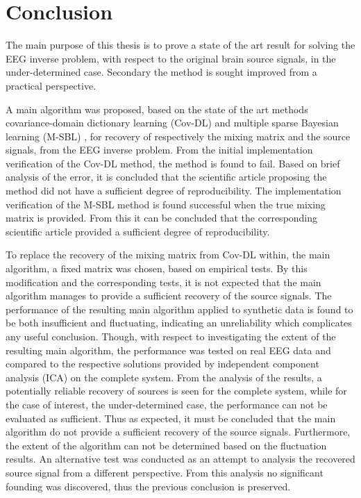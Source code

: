 \chapter{Conclusion}
The main purpose of this thesis is to prove a state of the art result for solving the EEG inverse problem, with respect to the original brain source signals, in the under-determined case.
Secondary the method is sought improved from a practical perspective.

A main algorithm was proposed, based on the state of the art methods covariance-domain dictionary learning (Cov-DL) \cite{Balkan2015} and multiple sparse Bayesian learning (M-SBL) \cite{Balkan2014}, for recovery of respectively the mixing matrix and the source signals, from the EEG inverse problem. 
From the initial implementation verification of the Cov-DL method, the method is found to fail. Based on brief analysis of the error, it is concluded that the scientific article proposing the method did not have a sufficient degree of reproducibility. 
The implementation verification of the M-SBL method is found successful when the true mixing matrix is provided. From this it can be concluded that the corresponding scientific article provided a sufficient degree of reproducibility. 

To replace the recovery of the mixing matrix from Cov-DL within, the main algorithm, a fixed matrix was chosen, based on empirical tests.
By this modification and the corresponding tests, it is not expected that the main algorithm manages to provide a sufficient recovery of the source signals. The performance of the resulting main algorithm applied to synthetic data is found to be both insufficient and fluctuating, indicating an unreliability which complicates any useful conclusion. 
Though, with respect to investigating the extent of the resulting main algorithm, the performance was tested on real EEG data and compared to the respective solutions provided by independent component analysis (ICA) on the complete system. 
From the analysis of the results, a potentially reliable recovery of sources is seen for the complete system, while for the case of interest, the under-determined case, the performance can not be evaluated as sufficient. Thus as expected, it must be concluded that the main algorithm do not provide a sufficient recovery of the source signals. Furthermore, the extent of the algorithm can not be determined based on the fluctuation results. 
An alternative test was conducted as an attempt to analysis the recovered source signal from a different perspective. From this analysis no significant founding was discovered, thus the previous conclusion is preserved. 

